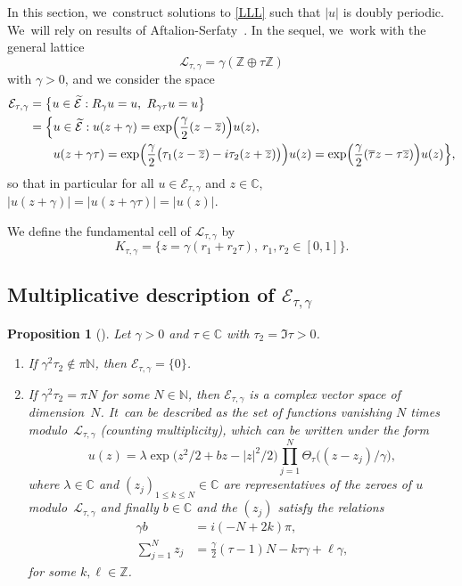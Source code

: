 \documentclass[10pt]{amsart}
\let\Subsection\subsection
\newtheorem{prop}[theorem]{Proposition}
\theoremstyle{definition}
\let\EE\exp
\let\ov\overline
\newcommand\C{\mathbb C}
\newcommand\E{\mathcal E}
\begin{document}
In this section, we~construct solutions to \eqref{LLL} such that $\vert u\vert$ is doubly periodic. We~will rely on results of Aftalion-Serfaty~\cite[\S 3]{AftaSerfa}. In the sequel, we~work with the general lattice
\[
\mathcal{L}_{\tau,\gamma} = \gamma(\mathbb{Z}\oplus \tau \mathbb{Z})
\]
with $\gamma>0 $, and we consider the space
\begin{align*}
\mathcal{E}_{\tau,\gamma}&=\bigl\{u\in \widetilde{\mathcal{E}}: R_\gamma u=u,\ R_{\gamma \tau} u=u\bigr\}\\
&=\Bigl\{u\in \widetilde{\mathcal{E}}: u(z+\gamma)=\EE\Bigl({\frac{\gamma}2(z-\ov{z})}\Bigr) u(z), \\
&\qquad u(z+\gamma\tau)=\EE\Bigl(\frac{\gamma}2 \bigl(\tau_1(z-\ov{z})-i\tau_2(z+\ov{z})\bigr)\Bigr) u(z)=\EE\Bigl(\frac{\gamma}{2}(\ov{\tau}z-\tau\ov{z})\Bigr) u(z)\Bigr\},
\end{align*}
so that in particular for all $u \in \mathcal{E}_{\tau,\gamma}$ and $z\in\mathbb{C}$, $\vert u(z+\gamma)\vert= \vert u(z+\gamma\tau)\vert=\vert u(z)\vert$. 

We define the fundamental cell of $\mathcal{L}_{\tau,\gamma}$ by
\begin{equation*}
K_{\tau,\gamma}=\bigl\{z=\gamma(r_{1}+r_{2}\tau),\ r_{1},r_{2}\in[0,1]\bigr\}.
\end{equation*}

\Subsection{Multiplicative description of $\E_{\tau,\gamma}$}

\begin{prop}[\cite{AftaSerfa}]\label{prop41}
Let $\gamma>0$ and $\tau \in \C$ with $\tau_2=\Im \tau >0$.
\begin{enumerate}
\item If $\gamma^2 \tau_2 \notin\pi \mathbb{N}$, then $\mathcal{E}_{\tau,\gamma} =\{ 0 \}$.
\item If $\gamma^2 \tau_2 = \pi N$ for some $N \in \mathbb{N}$, then $\mathcal{E}_{\tau,\gamma}$ is a complex vector space of dimension~$N$. It~can be described as the set of functions vanishing $N$ times modulo~$\mathcal{L}_{\tau,\gamma}$ (counting multiplicity), which can be written under the form
\begin{equation}\label{formprop}
u(z)=\lambda \EE\bigl(z^2/2 + b z- |z|^2/2\bigr) \prod_{j=1}^N\Theta_{\tau}\bigl(({z-z_j})/{\gamma} \bigr),
\end{equation}
where $\lambda \in \C$ and $(z_j)_{1\leq k\leq N}\in \C$ are representatives of the zeroes of $u$ modulo~$\mathcal{L}_{\tau,\gamma}$ and finally $b \in \mathbb{C}$ and the $(z_j)$ satisfy the relations
\begin{align}\label{somme}
\gamma b &= i(- N + 2k) \pi, \nonumber \\
\sum_{j=1}^N z_j &= \frac{\gamma}{2} (\tau - 1) N - k \tau \gamma + \ell \gamma,
\end{align}
for some $k,\ell \in \mathbb{Z}$.
\end{enumerate}
\end{prop}
\end{document}
